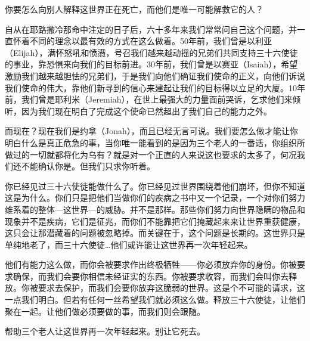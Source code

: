 \begin{scpbox}

你要怎么向别人解释这世界正在死亡，而他们是唯一可能解救它的人？

自从在耶路撒冷那命中注定的日子后，六十多年来我们常常问自己这个问题，并一直怀着不同的理念以最有效的方式在这么做着。50年前，我们曾是以利亚（Elijah），满怀怒吼和愤懑，号召我们越来越动摇的兄弟们共同支持三十六使徒的事业，靠恐惧来向我们的目标前进。30年前，我们曾是以赛亚（Isaiah），希望激励我们越来越胆怯的兄弟们，于是我们向他们确证我们使命的正义，向他们诉说我们使命的伟大，靠他们新寻到的信心来建起让我们的目标得以立足的大厦。10年前，我们曾是耶利米（Jeremiah），在世上最强大的力量面前哭诉，乞求他们来倾听，因为我们现在明白了完成这个使命已然超出了我们自己的能力之外。

而现在？现在我们是约拿（Jonah），而且已经无言可说。我们要怎么做才能让你明白什么是真正危急的事，当你唯一能看到的是因为三个老人的一番话，你组织所做过的一切就都将化为乌有？就是对一个正直的人来说这也要求的太多了，何况我们还不能确认你是。但我们只求你听着。

你已经见过三十六使徒能做什么了。你已经见过世界围绕着他们崩坏，但你不知道这是为什么。你们只是把他们当做你们的疾病之书中又一个记录，一个对你们努力维系着的整体—这世界—的威胁。并不是那样。那些你们努力向世界隐瞒的物品和现象并不是疾病，它们是征兆，而你们不能靠把它们掩藏起来来让世界重获健康，这只会让那潜藏着的问题被忽略掉。而关键在于，这个问题是长期的。这世界只是单纯地老了，而三十六使徒…他们或许能让这世界再一次年轻起来。

他们有能力这么做，而你会被要求作出终极牺牲——你必须放弃你的身份。你被要求确保，而我们会要你相信未经证实的东西。你被要求收容，而我们会叫你去释放。你被要求去保护，而我们会要你放弃这脆弱的世界。这是个不可能的请求，这一点我们明白。但若有任何一丝希望我们就必须这么做。释放三十六使徒，让他们聚在一起。让他们做必须要做的事，而我们则会跟随。

帮助三个老人让这世界再一次年轻起来。别让它死去。

\end{scpbox}
